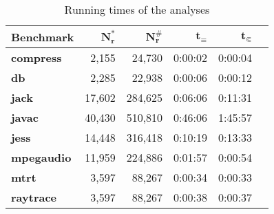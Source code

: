 \begin{table}[h]
\caption{Running times of the analyses}\label{tab:runtimes}
\centering
\setlength{\tabcolsep}{2ex}
\begin{tabular}{lrrrrr}
\toprule
\textbf{Benchmark}   & $\bm{N^*_r}$ & $\bm{N^\#_r}$ & $\bm{t_\equiv}$ & $\bm{t_{\Subset}}$ \\ \midrule
\textbf{compress}    & 2,155        & 24,730        & 0:00:02         & 0:00:04            \\
\textbf{db}          & 2,285        & 22,938        & 0:00:06         & 0:00:12            \\
\textbf{jack}        & 17,602       & 284,625       & 0:06:06         & 0:11:31            \\
\textbf{javac}       & 40,430       & 510,810       & 0:46:06         & 1:45:57            \\
\textbf{jess}        & 14,448       & 316,418       & 0:10:19         & 0:13:33           \\
\textbf{mpegaudio}   & 11,959       & 224,886       & 0:01:57         & 0:00:54            \\
\textbf{mtrt}        & 3,597        & 88,267        & 0:00:34         &                   0:00:33 \\
\textbf{raytrace}    & 3,597        & 88,267        & 0:00:38         &                   0:00:37 \\ \bottomrule
\end{tabular}
\end{table}
